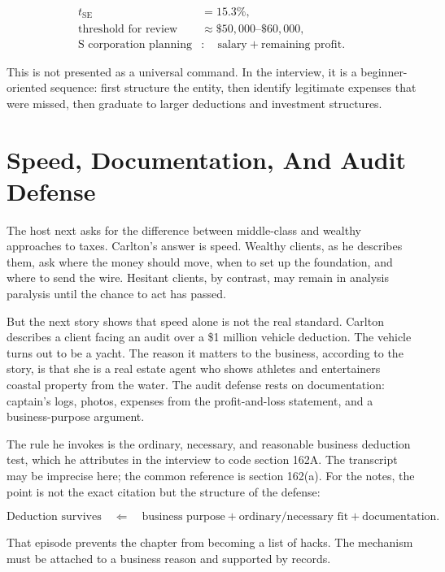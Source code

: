\begin{align}
t_{\mathrm{SE}} &= 15.3\%,\\
\text{threshold for review} &\approx \$50{,}000\text{--}\$60{,}000,\\
\text{S corporation planning} &:\quad
\text{salary}+\text{remaining profit}.
\end{align}

This is not presented as a universal command. In the interview, it is a beginner-oriented sequence: first structure the entity, then identify legitimate expenses that were missed, then graduate to larger deductions and investment structures.

\section{Speed, Documentation, And Audit Defense}

The host next asks for the difference between middle-class and wealthy approaches to taxes. Carlton's answer is speed. Wealthy clients, as he describes them, ask where the money should move, when to set up the foundation, and where to send the wire. Hesitant clients, by contrast, may remain in analysis paralysis until the chance to act has passed.

But the next story shows that speed alone is not the real standard. Carlton describes a client facing an audit over a \$1 million vehicle deduction. The vehicle turns out to be a yacht. The reason it matters to the business, according to the story, is that she is a real estate agent who shows athletes and entertainers coastal property from the water. The audit defense rests on documentation: captain's logs, photos, expenses from the profit-and-loss statement, and a business-purpose argument.

The rule he invokes is the ordinary, necessary, and reasonable business deduction test, which he attributes in the interview to code section 162A. The transcript may be imprecise here; the common reference is section 162(a). For the notes, the point is not the exact citation but the structure of the defense:

\begin{equation}
\text{Deduction survives}
\quad\Longleftarrow\quad
\text{business purpose}+\text{ordinary/necessary fit}+\text{documentation}.
\end{equation}

That episode prevents the chapter from becoming a list of hacks. The mechanism must be attached to a business reason and supported by records.

